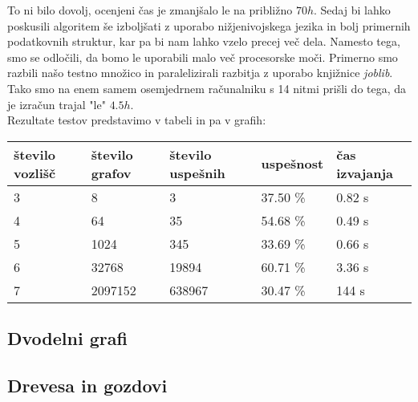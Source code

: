 \documentclass[12pt,a4paper]{amsart}
\theoremstyle{definition} %
\theoremstyle{plain} %
\begin{document}
To ni bilo dovolj, ocenjeni čas je zmanjšalo le na približno $70h$. Sedaj bi lahko poskusili algoritem še izboljšati z uporabo nižjenivojskega jezika in bolj
primernih podatkovnih struktur, kar pa bi nam lahko vzelo precej več dela. Namesto tega, smo se odločili, da bomo le uporabili malo več procesorske moči. Primerno
smo razbili našo testno množico in paralelizirali razbitja z uporabo knjižnice \emph{joblib}.
Tako smo na enem samem osemjedrnem računalniku s 14 nitmi prišli do tega, da je izračun trajal "le" $4.5h$.
\\

\noindent Rezultate testov predstavimo v tabeli in pa v grafih:
\begin{table}[h]
\begin{tabular}{|l|l|l|l|l|}
\hline
\textbf{število vozlišč} & \textbf{število grafov} & \textbf{število uspešnih} & \textbf{uspešnost} & \textbf{čas izvajanja} \\ \hline
3           & 8            & 3                & 37.50 \%     & 0.82 s         \\ \hline
4           & 64           & 35               & 54.68 \%     & 0.49 s         \\ \hline
5           & 1024         & 345              & 33.69 \%     & 0.66 s         \\ \hline
6           & 32768        & 19894            & 60.71 \%     & 3.36 s         \\ \hline
7           & 2097152      & 638967           & 30.47 \%    & 144 s          \\ \hline
\end{tabular}
\end{table}

\subsection{Dvodelni grafi}
\subsection{Drevesa in gozdovi}
\end{document}
